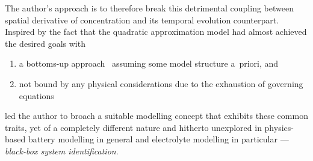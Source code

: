 The author's  approach is to  therefore break this detrimental  coupling between
spatial  derivative of  concentration  and its  temporal evolution  counterpart.
Inspired by the fact that the  quadratic approximation model had almost achieved
the desired goals with
\begin{enumerate}[label=\emph{\alph*})]
    \item a bottoms-up approach \ie~assuming some model structure a~priori, and
    \item not bound by any physical considerations due to the exhaustion of governing equations
\end{enumerate}
led  the author  to  broach a  suitable modelling  concept  that exhibits  these
common  traits, yet  of a  completely different  nature and  hitherto unexplored
in  physics-based battery  modelling  in general  and  electrolyte modelling  in
particular --- \emph{black-box system identification}.


